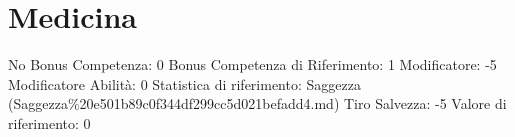 \section{Medicina}\label{medicina}

\begin{description}
\tightlist
\item[Tags: ABI]
No Bonus Competenza: 0 Bonus Competenza di Riferimento: 1 Modificatore:
-5 Modificatore Abilità: 0 Statistica di riferimento: Saggezza
(Saggezza\%20e501b89c0f344df299cc5d021befadd4.md) Tiro Salvezza: -5
Valore di riferimento: 0
\end{description}

